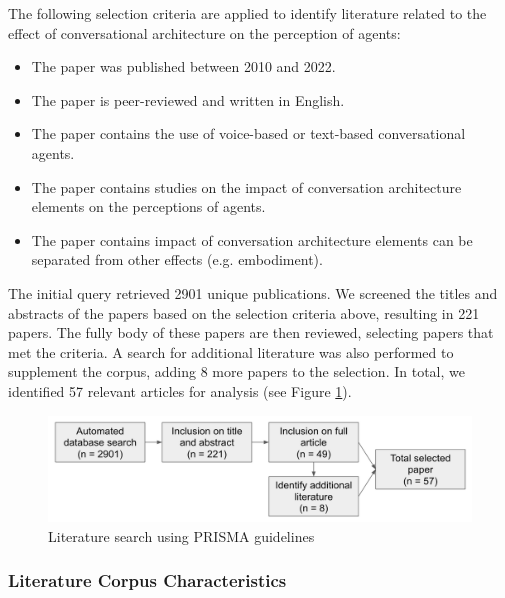 \documentclass[sigconf,screen,review, anonymous]{acmart}
\begin{document}
The following selection criteria are applied to identify literature related to the effect of conversational architecture on the perception of agents:
\begin{itemize}
  \item The paper was published between 2010 and 2022.
  \item The paper is peer-reviewed and written in English.
  \item The paper contains the use of voice-based or text-based conversational agents.
  \item The paper contains studies on the impact of conversation architecture elements on the perceptions of agents.
  \item The paper contains impact of conversation architecture elements can be separated from other effects (e.g. embodiment).

\end{itemize}

The initial query retrieved 2901 unique publications. We screened the titles and abstracts of the papers based on the selection criteria above, resulting in 221 papers. The fully body of these papers are then reviewed, selecting papers that met the criteria. A search for additional literature was also performed to supplement the corpus, adding 8 more papers to the selection. In total, we identified 57 relevant articles for analysis (see Figure \ref{fig:prisma}).

\begin{figure}[h]
  \centering
  \includegraphics[width=1\columnwidth]{fig-prisma.png}
  \caption{Literature search using PRISMA guidelines}
  \label{fig:prisma}
\end{figure}

\subsubsection*{Literature Corpus Characteristics}
\end{document}
